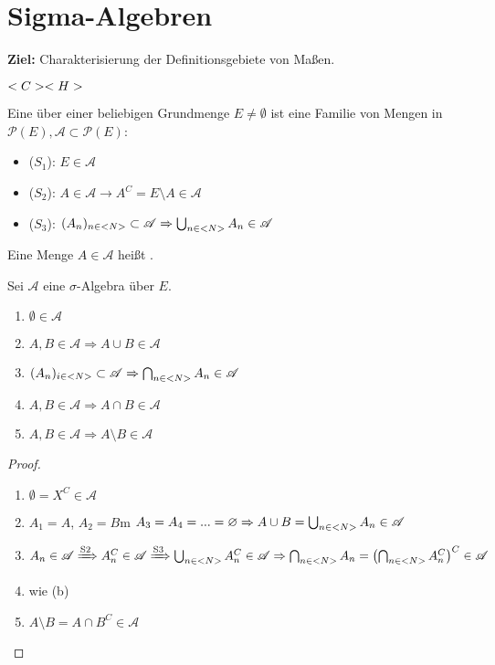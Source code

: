 \section{Sigma-Algebren}

\textbf{Ziel:} Charakterisierung der Definitionsgebiete von Maßen.


$<C> <H>$

\begin{definition}
	Eine  über einer beliebigen Grundmenge $E \neq \emptyset$ ist eine Familie von Mengen in $\mathscr{P}(E), \mathscr{A} \subset \mathscr{P}(E)$:
	\begin{itemize}
		\item ($S_1$): $E \in \mathscr{A}$
		\item ($S_2$): $A \in \mathscr{A} \to A^C = E \setminus A \in \mathscr{A}$
		\item ($S_3$): $(A_n)_{n\in <N>} \subset \mathscr{A} \Rightarrow \bigcup_{n\in <N>}A_n \in \mathscr{A}$
	\end{itemize}
	Eine Menge $A\in\mathscr{A}$ heißt .
\end{definition}

\begin{proposition}
	Sei $\mathscr{A}$ eine $\sigma$-Algebra über $E$.
	\begin{enumerate}[label=(\alph*)]
		\item $\emptyset\in\mathscr{A}$
		\item $A,B\in\mathscr{A}\Rightarrow A\cup B\in\mathscr{A}$
		\item $(A_n)_{i\in<N>}\subset\mathscr{A}\Rightarrow\bigcap_{n\in <N>}A_n\in\mathscr{A}$
		\item $A,B\in\mathscr{A}\Rightarrow A\cap B\in\mathscr{A}$
		\item $A,B\in\mathscr{A}\Rightarrow A\setminus B\in\mathscr{A}$
	\end{enumerate}
\end{proposition}
\begin{proof}
	\begin{enumerate}[label=(\alph*)]
		\item $\emptyset=X^C\in\mathscr{A}$
		\item $A_1=A$, $A_2=B$m $A_3=A_4=...=\varnothing\Rightarrow A\cup B=\bigcup_{n\in <N>} A_n\in\mathscr{A}$
		\item $A_n\in\mathscr{A}\xRightarrow{\text{S2}}A_n^C\in\mathscr{A}\xRightarrow{\text{S3}}\bigcup_{n\in <N>} A_n^C\in\mathscr{A}\Rightarrow\bigcap_{n\in <N>}A_n=\left(\bigcap_{n\in <N>} A_n^C\right)^C\in\mathscr{A}$
		\item wie (b)
		\item $A\setminus B=A\cap B^C\in\mathscr{A}$
	\end{enumerate}
\end{proof}

